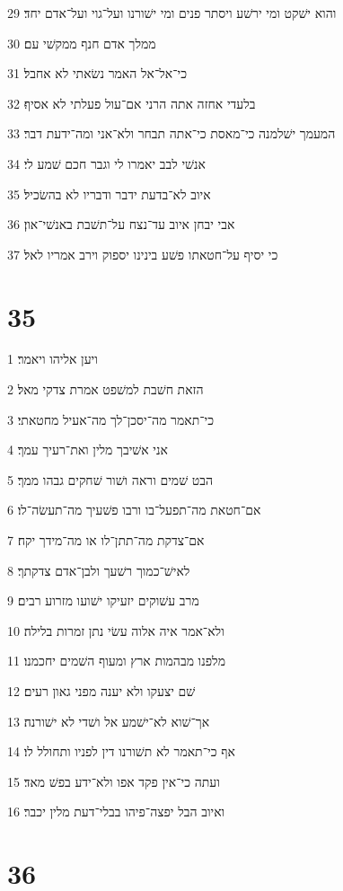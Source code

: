 \par 29 והוא ישׁקט ומי ירשׁע ויסתר פנים ומי ישׁורנו ועל־גוי ועל־אדם יחד׃
\par 30 ממלך אדם חנף ממקשׁי עם׃
\par 31 כי־אל־אל האמר נשׂאתי לא אחבל׃
\par 32 בלעדי אחזה אתה הרני אם־עול פעלתי לא אסיף׃
\par 33 המעמך ישׁלמנה כי־מאסת כי־אתה תבחר ולא־אני ומה־ידעת דבר׃
\par 34 אנשׁי לבב יאמרו לי וגבר חכם שׁמע לי׃
\par 35 איוב לא־בדעת ידבר ודבריו לא בהשׂכיל׃
\par 36 אבי יבחן איוב עד־נצח על־תשׁבת באנשׁי־און׃
\par 37 כי יסיף על־חטאתו פשׁע בינינו יספוק וירב אמריו לאל׃

\chapter{35}

\par 1 ויען אליהו ויאמר׃
\par 2 הזאת חשׁבת למשׁפט אמרת צדקי מאל׃
\par 3 כי־תאמר מה־יסכן־לך מה־אעיל מחטאתי׃
\par 4 אני אשׁיבך מלין ואת־רעיך עמך׃
\par 5 הבט שׁמים וראה ושׁור שׁחקים גבהו ממך׃
\par 6 אם־חטאת מה־תפעל־בו ורבו פשׁעיך מה־תעשׂה־לו׃
\par 7 אם־צדקת מה־תתן־לו או מה־מידך יקח׃
\par 8 לאישׁ־כמוך רשׁעך ולבן־אדם צדקתך׃
\par 9 מרב עשׁוקים יזעיקו ישׁועו מזרוע רבים׃
\par 10 ולא־אמר איה אלוה עשׂי נתן זמרות בלילה׃
\par 11 מלפנו מבהמות ארץ ומעוף השׁמים יחכמנו׃
\par 12 שׁם יצעקו ולא יענה מפני גאון רעים׃
\par 13 אך־שׁוא לא־ישׁמע אל ושׁדי לא ישׁורנה׃
\par 14 אף כי־תאמר לא תשׁורנו דין לפניו ותחולל לו׃
\par 15 ועתה כי־אין פקד אפו ולא־ידע בפשׁ מאד׃
\par 16 ואיוב הבל יפצה־פיהו בבלי־דעת מלין יכבר׃

\chapter{36}

